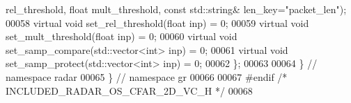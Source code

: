 \begin{DoxyCode}
      rel\_threshold, \textcolor{keywordtype}{float} mult\_threshold, \textcolor{keyword}{const} std::string& len\_key=\textcolor{stringliteral}{"packet\_len"});
00058       \textcolor{keyword}{virtual} \textcolor{keywordtype}{void} set\_rel\_threshold(\textcolor{keywordtype}{float} inp) = 0;
00059       \textcolor{keyword}{virtual} \textcolor{keywordtype}{void} set\_mult\_threshold(\textcolor{keywordtype}{float} inp) = 0;
00060       \textcolor{keyword}{virtual} \textcolor{keywordtype}{void} set\_samp\_compare(std::vector<int> inp) = 0;
00061       \textcolor{keyword}{virtual} \textcolor{keywordtype}{void} set\_samp\_protect(std::vector<int> inp) = 0;
00062     \};
00063 
00064   \} \textcolor{comment}{// namespace radar}
00065 \} \textcolor{comment}{// namespace gr}
00066 
00067 \textcolor{preprocessor}{#endif }\textcolor{comment}{/* INCLUDED\_RADAR\_OS\_CFAR\_2D\_VC\_H */}\textcolor{preprocessor}{}
00068 
\end{DoxyCode}
